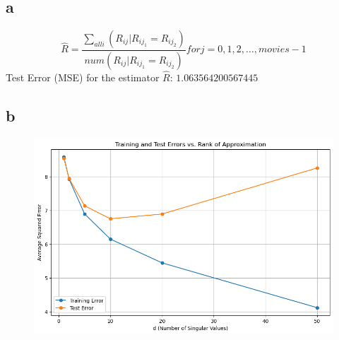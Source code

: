 \newpage
\section{}
\subsection{a}

\[
\hat{R} = \frac{\sum_{all i}(R_{ij}| R_{ij_1} = R_{ij_2})}{num(R_{ij}| R_{ij_1} = R_{ij_2}) } for j = 0, 1, 2, \dots, movies -1
\]
Test Error (MSE) for the estimator $\hat{R}$: $1.063564200567445$

\subsection{b}
\begin{figure}[!ht]
    \centering\includegraphics[width=0.7\linewidth]{MSE_USV.png}
\end{figure}


